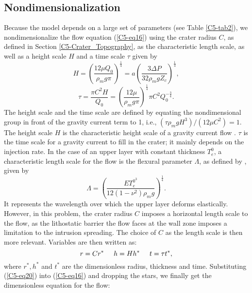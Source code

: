 \subsection{Nondimensionalization}
\label{C5-Dimensionless_Equation}

Because the  model depends  on a  large set  of parameters  (see Table
\ref{C5-tab2}), we nondimensionalize the flow equation (\ref{C5-eq16})
using    the   crater    radius   $C$,    as   defined    in   Section
\ref{C5-Crater_Topography},  as the  characteristic  length scale,  as
well as a height scale $H$ and a time scale $\tau$ given by
\begin{equation}
  \label{C5-eq18}
  H= \left (\frac{12\mu Q_{0}}{\rho_{m}g \pi}\right ) ^{\frac{1}{4}}=a\left( \frac{3 \Delta P}{32\rho_{m}gZ_{c}}\right ) ^{\frac{1}{4}},
\end{equation}
\begin{equation}
  \tau=\frac{\pi C^{2} H}{Q_{0}}=\left (\frac{12\mu}{\rho_{m}g \pi}\right)^{\frac{1}{4}}\pi C^{2}Q_{0}^{-\frac{
      3}{4}}.\label{C5-eq19}
\end{equation}
The  height scale  and  the time  scale are  defined  by equating  the
nondimensional group in front of the  gravity current term to 1, i.e.,
$(\tau \rho_{m}gH^{3})/(12\mu  C^{2})=1$. The height scale  $H$ is the
characteristic   height    scale   of    a   gravity    current   flow
\citep{Huppert:1982a}. $\tau$ is the time  scale for a gravity current
to fill in the crater; it mainly depends on the injection rate. In the
case  of   an  upper   layer  with   constant  thickness   $T_e^0$,  a
characteristic length  scale for  the flow  is the  flexural parameter
$\Lambda$, as defined by \citet{Turcotte:1982ca}, given by
\begin{equation}
  \Lambda=\left( \frac{E T_{e}^{0^{3}}}{12 (1-\nu^{2})\rho_{m}g} \right )^{\frac{1}{4}}.
  \label{C5-eq99}
\end{equation}
It  represents  the wavelength  over  which  the upper  layer  deforms
elastically. However, in this problem, the crater radius $C$ imposes a
horizontal length  scale to the  flow, as the lithostatic  barrier the
flow faces  at the  wall zone  imposes a  limitation to  the intrusion
spreading.   The choice  of  $C$  as the  length  scale  is then  more
relevant. Variables are then written as:
\begin{equation}
  r=Cr^{*} \hspace{0.5cm}h=Hh^{*} \hspace{0.5cm} t=\tau t^{*} ,
  \label{C5-eq20}
\end{equation}
where  $r^{*},h^{*}$   and  $t^{*}$  are  the   dimensionless  radius,
thickness and time.  Substituting (\ref{C5-eq20}) into (\ref{C5-eq16})
and dropping the stars, we  finally get the dimensionless equation for
the flow:

